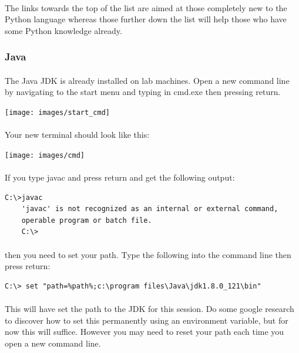 \documentclass[10pt, a4paper, twosize]{article}
\begin{document}
\paragraph{} The links towards the top of the list are aimed at those completely new to the Python language whereas those further down the list will help those who have some Python knowledge already.

\subsubsection{Java}

\paragraph{} The Java JDK is already installed on lab machines. Open a new command line by navigating to the start menu and typing in cmd.exe then pressing return.


\texttt{[image: images/start\_cmd]}

\paragraph{} Your new terminal should look like this:

\texttt{[image: images/cmd]}

\paragraph{} If you type javac and press return and get the following output:

\begin{lstlisting}[style=DOS]
    C:\>javac
    'javac' is not recognized as an internal or external command,
    operable program or batch file.
    C:\>
\end{lstlisting}

\paragraph{} then you need to set your path. Type the following into the command line then press return:

\begin{lstlisting}[style=DOS]
    C:\> set "path=%path%;c:\program files\Java\jdk1.8.0_121\bin"
\end{lstlisting}


\paragraph{} This will have set the path to the JDK for this session. Do some google research to discover how to set this permanently using an environment variable, but for now this will suffice. However you may need to reset your path each time you open a new command line.
\end{document}

